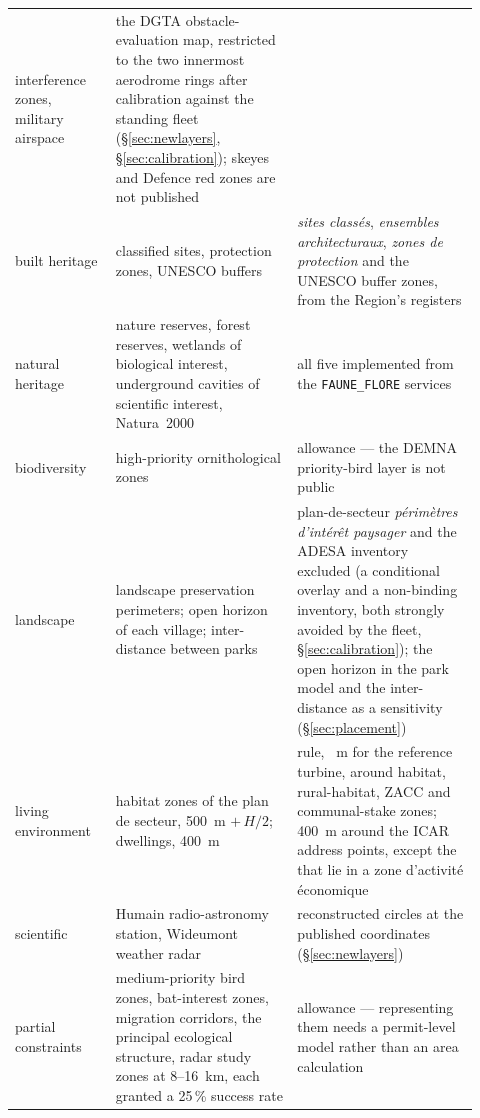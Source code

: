 \documentclass[11pt,a4paper]{article}
\begin{document}
\begin{table}[htbp]
\begin{tabular}{p{0.20\linewidth}p{0.36\linewidth}p{0.36\linewidth}}
    interference zones, military airspace
  & the DGTA obstacle-evaluation map, restricted to the two innermost aerodrome
    rings after calibration against the standing fleet
    (§\ref{sec:newlayers}, §\ref{sec:calibration}); skeyes and Defence
    red zones are not published \\
built heritage & classified sites, protection zones, UNESCO buffers
  & \emph{sites classés}, \emph{ensembles architecturaux}, \emph{zones de
    protection} and the UNESCO buffer zones, from the Region's registers \\
natural heritage
  & nature reserves, forest reserves, wetlands of biological interest,
    underground cavities of scientific interest, Natura~2000
  & all five implemented from the \texttt{FAUNE\_FLORE} services \\
biodiversity
  & high-priority ornithological zones
  & \textcolor{warn}{allowance} --- the DEMNA priority-bird layer is not public \\
landscape
  & landscape preservation perimeters; open horizon of each village;
    inter-distance between parks
  & plan-de-secteur \emph{périmètres d'intérêt paysager} and the ADESA
    inventory excluded (a conditional overlay and a non-binding inventory,
    both strongly avoided by the fleet, §\ref{sec:calibration}); the open
    horizon in the park model and the inter-distance as a sensitivity
    (§\ref{sec:placement}) \\
living environment
  & habitat zones of the plan de secteur, \SI{500}{\metre} $+\,H/2$;
    dwellings, \SI{400}{\metre}
  & \HabitatRule{} rule, \HabitatSetback{}~m for the reference turbine, around
    habitat, rural-habitat, ZACC and communal-stake zones; \SI{400}{\metre}
    around the ICAR address points, except the \AddrExempt{} that lie in a zone
    d'activité économique \\
scientific
  & Humain radio-astronomy station, Wideumont weather radar
  & reconstructed circles at the published coordinates
    (§\ref{sec:newlayers}) \\
partial constraints
  & medium-priority bird zones, bat-interest zones, migration corridors, the
    principal ecological structure, radar study zones at 8--16~km, each granted
    a 25\,\% success rate
  & \textcolor{warn}{allowance} --- representing them needs a permit-level model
    rather than an area calculation \\
\bottomrule
\end{tabular}
\end{table}
\end{document}
